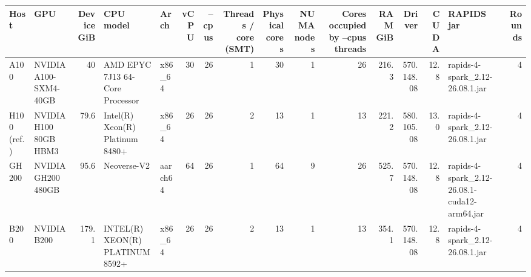 \begin{tabular}{llrllrrrrrrrrrlr}
\toprule
Host & GPU & Device GiB & CPU model & Arch & vCPU & --cpus & Threads / core (SMT) & Physical cores & NUMA nodes & Cores occupied by --cpus threads & RAM GiB & Driver & CUDA & RAPIDS jar & Rounds \\
\midrule
A100 & NVIDIA A100-SXM4-40GB & 40 & AMD EPYC 7J13 64-Core Processor & x86\_64 & 30 & 26 & 1 & 30 & 1 & 26 & 216.3 & 570.148.08 & 12.8 & rapids-4-spark\_2.12-26.08.1.jar & 4 \\
H100 (ref.) & NVIDIA H100 80GB HBM3 & 79.6 & Intel(R) Xeon(R) Platinum 8480+ & x86\_64 & 26 & 26 & 2 & 13 & 1 & 13 & 221.2 & 580.105.08 & 13.0 & rapids-4-spark\_2.12-26.08.1.jar & 4 \\
GH200 & NVIDIA GH200 480GB & 95.6 & Neoverse-V2 & aarch64 & 64 & 26 & 1 & 64 & 9 & 26 & 525.7 & 570.148.08 & 12.8 & rapids-4-spark\_2.12-26.08.1-cuda12-arm64.jar & 4 \\
B200 & NVIDIA B200 & 179.1 & INTEL(R) XEON(R) PLATINUM 8592+ & x86\_64 & 26 & 26 & 2 & 13 & 1 & 13 & 354.1 & 570.148.08 & 12.8 & rapids-4-spark\_2.12-26.08.1.jar & 4 \\
\bottomrule
\end{tabular}

